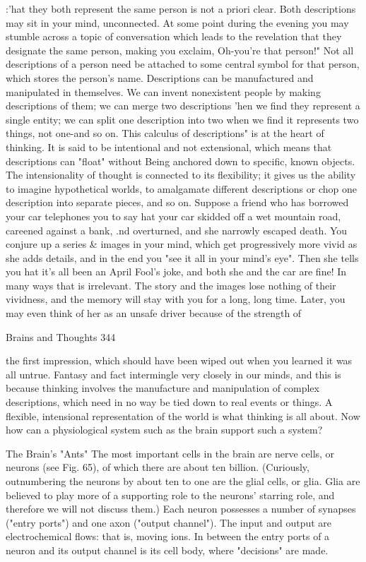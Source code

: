 :'hat they both represent the same person is not a priori clear. Both descriptions may sit in
your mind, unconnected. At some point during the evening you may stumble across a
topic of conversation which leads to the revelation that they designate the same person,
making you exclaim, Oh-you're that person!"
Not all descriptions of a person need be attached to some central symbol for that person,
which stores the person's name. Descriptions can be manufactured and manipulated in
themselves. We can invent nonexistent people by making descriptions of them; we can
merge two descriptions 'hen we find they represent a single entity; we can split one
description into two when we find it represents two things, not one-and so on. This
calculus of descriptions" is at the heart of thinking. It is said to be intentional and not
extensional, which means that descriptions can "float" without Being anchored down to
specific, known objects. The intensionality of thought is connected to its flexibility; it
gives us the ability to imagine hypothetical worlds, to amalgamate different descriptions
or chop one description into separate pieces, and so on.
Suppose a friend who has borrowed your car telephones you to say hat your car skidded
off a wet mountain road, careened against a bank, .nd overturned, and she narrowly
escaped death. You conjure up a series \& images in your mind, which get progressively
more vivid as she adds details, and in the end you "see it all in your mind's eye". Then
she tells you hat it's all been an April Fool's joke, and both she and the car are fine! In
many ways that is irrelevant. The story and the images lose nothing of their vividness,
and the memory will stay with you for a long, long time. Later, you may even think of
her as an unsafe driver because of the strength of




Brains and Thoughts                                                                       344

the first impression, which should have been wiped out when you learned it was all
untrue. Fantasy and fact intermingle very closely in our minds, and this is because
thinking involves the manufacture and manipulation of complex descriptions, which need
in no way be tied down to real events or things.
A flexible, intensional representation of the world is what thinking is all about. Now how
can a physiological system such as the brain support such a system?

                                 The Brain's "Ants"
The most important cells in the brain are nerve cells, or neurons (see Fig. 65), of which
there are about ten billion. (Curiously, outnumbering the neurons by about ten to one are
the glial cells, or glia. Glia are believed to play more of a supporting role to the neurons'
starring role, and therefore we will not discuss them.) Each neuron possesses a number of
synapses ("entry ports") and one axon ("output channel"). The input and output are
electrochemical flows: that is, moving ions. In between the entry ports of a neuron and its
output channel is its cell body, where "decisions" are made.




